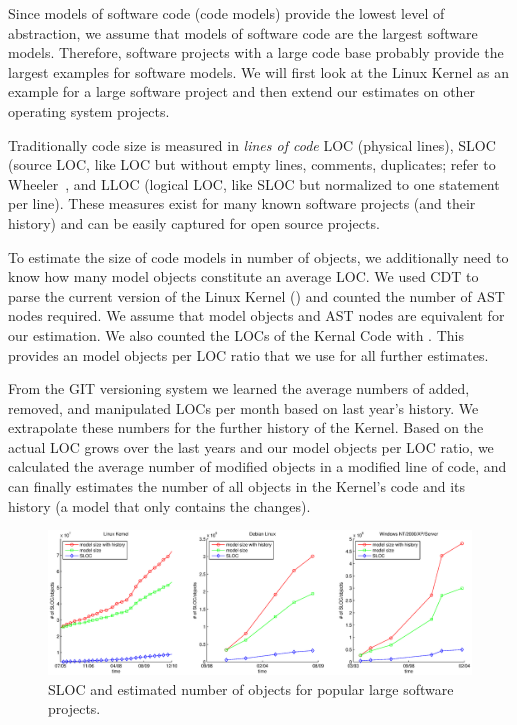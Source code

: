 Since models of software code (code models) provide the lowest level of abstraction, we assume that models of software code are the largest software models. Therefore, software projects with a large code base probably provide the largest examples for software models. We will first look at the Linux Kernel as an example for a large software project and then extend our estimates on other operating system projects.

Traditionally code size is measured in \emph{lines of code} LOC (physical lines), SLOC (source LOC, like LOC but without empty lines, comments, duplicates; refer to Wheeler~\cite{wheeler}, and LLOC (logical LOC, like SLOC but normalized to one statement per line). These measures exist for many known software projects (and their history) and can be easily captured for open source projects. 

To estimate the size of code models in number of objects, we additionally need to know how many model objects constitute an average LOC. We used CDT to parse the current version of the Linux Kernel () and counted the number of AST nodes required. We assume that model objects and AST nodes are equivalent for our estimation. We also counted the LOCs of the Kernal Code with . This provides an model objects per LOC ratio that we use for all further estimates.

From the GIT versioning system we learned the average numbers of added, removed, and manipulated LOCs per month based on last year's history. We extrapolate these numbers for the further history of the Kernel. Based on the actual LOC grows over the last years and our model objects per LOC ratio, we calculated the average number of modified objects in a modified line of code, and can finally estimates the number of all objects in the Kernel's code and its history (a model that only contains the changes).

\begin{figure}
  \centering
  \includegraphics[width=\linewidth]{figures/software_model_sizes}
  \caption{SLOC and estimated number of objects for popular large software projects.}
  \label{fig:software_model_sizes}
\end{figure}


